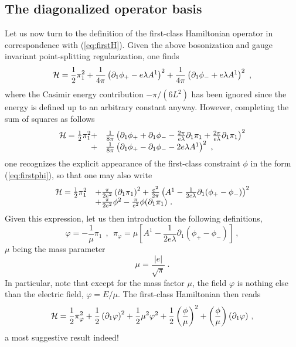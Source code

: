 \documentclass[a4paper,11pt]{article}
\begin{document}
\subsection{The diagonalized operator basis}

Let us now turn to the definition of the first-class Hamiltonian
operator in correspondence with (\ref{eq:firstH}). Given the above
bosonization and gauge invariant point-splitting regularization, one finds
\begin{equation}
{\cal H}=\frac{1}{2}\pi^2_1
+\frac{1}{4\pi}\left(\partial_1\phi_+-e\lambda A^1\right)^2
+\frac{1}{4\pi}\left(\partial_1\phi_-+e\lambda A^1\right)^2\ ,
\end{equation}
where the Casimir energy contribution $-\pi/(6L^2)$ has been ignored since
the energy is defined up to an arbitrary constant anyway.
However, completing the sum of squares as follows
\begin{equation}
\begin{array}{r l}
{\cal H}=\frac{1}{2}\pi^2_1
+&\frac{1}{8\pi}\left(\partial_1\phi_++\partial_1\phi_--\frac{2\pi}{e\lambda}
\partial_1\pi_1+\frac{2\pi}{e\lambda}\partial_1\pi_1\right)^2\\
+&\frac{1}{8\pi}\left(\partial_1\phi_+-\partial_1\phi_--2e\lambda A^1\right)^2
\ ,
\end{array}
\end{equation}
one recognizes the explicit appearance of the first-class constraint
$\phi$ in the form (\ref{eq:firstphi}), so that one may also write
\begin{equation}
\begin{array}{r l}
{\cal H}=\frac{1}{2}\pi^2_1&+\frac{\pi}{2e^2}\left(\partial_1\pi_1\right)^2
+\frac{e^2}{2\pi}\left(A^1-\frac{1}{2e\lambda}\partial_1(\phi_+-\phi_-)\right)^2
\\
&+\frac{\pi}{2e^2}\phi^2-\frac{\pi}{e^2}\phi(\partial_1\pi_1)\ .
\end{array}
\end{equation}
Given this expression, let us then introduction the following definitions,
\begin{equation}
\varphi=-\frac{1}{\mu}\pi_1\ \ ,\ \ 
\pi_\varphi=\mu\left[A^1-\frac{1}{2e\lambda}\partial_1(\phi_+-\phi_-)\right]\ ,
\end{equation}
$\mu$ being the mass parameter
\begin{equation}
\mu=\frac{|e|}{\sqrt{\pi}}\ .
\end{equation}
In particular, note that except for the mass factor $\mu$, the field
$\varphi$ is nothing else than the electric field, $\varphi=E/\mu$.
The first-class Hamiltonian then reads
\begin{equation}
{\cal H}=\frac{1}{2}\pi^2_\varphi+\frac{1}{2}\left(\partial_1\varphi\right)^2
+\frac{1}{2}\mu^2\varphi^2+\frac{1}{2}\left(\frac{\phi}{\mu}\right)^2+
\left(\frac{\phi}{\mu}\right)(\partial_1\varphi)\ ,
\label{eq:H2}
\end{equation}
a most suggestive result indeed!
\end{document}
